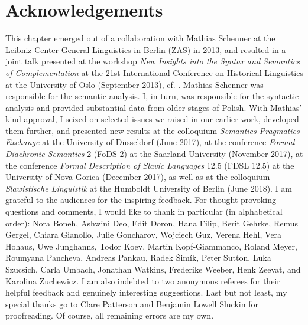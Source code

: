 \documentclass[output=paper
,modfonts
,nonflat]{langsci/langscibook}
\begin{document}
\section*{Acknowledgements} This chapter emerged out of a collaboration with Mathias Schenner at the Leibniz-Center General Linguistics in Berlin (ZAS) in 2013, and resulted in a joint talk presented at the workshop \emph{New Insights into the Syntax and Semantics of Complementation} at the 21st International Conference on Historical Linguistics at the University of Oslo (September 2013), cf. \textcite{JedrzejowskiSchenner-2013}. Mathias Schenner was responsible for the semantic analysis. I, in turn, was responsible for the syntactic analysis and provided substantial data from older stages of Polish. With Mathias'  kind approval, I seized on selected issues we raised in our earlier work, developed them further, and presented new results at the colloquium \emph{Semantics-Pragmatics Exchange} at the University of Düsseldorf (June 2017), at the conference \emph{Formal Diachronic Semantics} 2 (FoDS 2) at the Saarland University (November 2017), at the conference \emph{Formal Description of Slavic Languages} 12.5 (FDSL 12.5) at the University of Nova Gorica (December 2017), as well as at the colloquium \emph{Slawistische Linguistik} at the Humboldt University of Berlin (June 2018). I am grateful to the audiences for the inspiring feedback. For thought-provoking questions and comments, I would like to thank in particular (in alphabetical order): Nora Boneh, Ashwini Deo, Edit Doron, Hana Filip, Berit Gehrke, Remus Gergel, Chiara Gianollo, Julie Goncharov, Wojciech Guz, Verena Hehl, Vera Hohaus, Uwe Junghanns, Todor Koev, Martin Kopf-Giammanco, Roland Meyer, Roumyana Pancheva, Andreas Pankau, Radek Šimík, Peter Sutton, Luka Szucsich, Carla Umbach, Jonathan Watkins, Frederike Weeber, Henk Zeevat, and Karolina Zuchewicz. I am also indebted to two anonymous referees for their helpful feedback and genuinely interesting suggestions. Last but not least, my special thanks go to Clare Patterson and Benjamin Lowell Sluckin for proofreading. Of course, all remaining errors are my own.         
   

{\sloppy
\printbibliography[heading=subbibliography,notkeyword=this]
}
\end{document}
